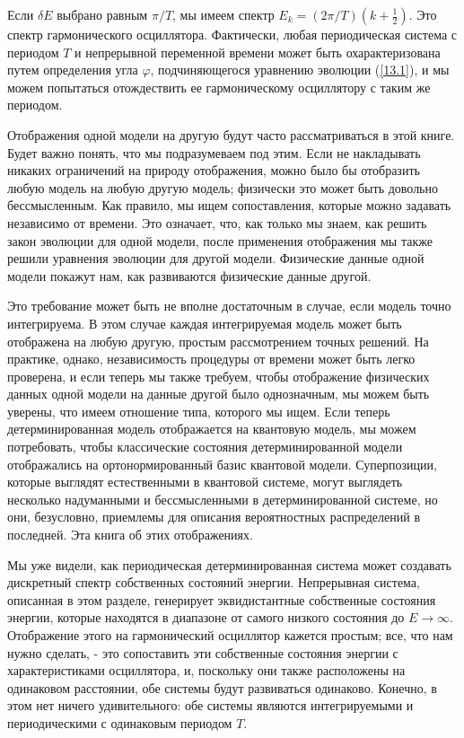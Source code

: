 \documentclass[main.tex]{subfiles}
\begin{document}
Если $\delta E$ выбрано равным $\pi / T$, мы имеем спектр $E_k = (2\pi / T) (k + \frac 1 2)$. Это спектр гармонического осциллятора. Фактически, любая периодическая система с периодом $T$ и непрерывной переменной времени может быть охарактеризована путем определения угла $\varphi$, подчиняющегося уравнению эволюции (\ref{13.1}), и мы можем попытаться отождествить ее гармоническому осциллятору с таким же периодом.

Отображения одной модели на другую будут часто рассматриваться в этой книге. Будет важно понять, что мы подразумеваем под этим. Если не накладывать никаких ограничений на природу отображения, можно было бы отобразить любую модель на любую другую модель; физически это может быть довольно бессмысленным. Как правило, мы ищем сопоставления, которые можно задавать независимо от времени. Это означает, что, как только мы знаем, как решить закон эволюции для одной модели, после применения отображения мы также решили уравнения эволюции для другой модели. Физические данные одной модели покажут нам, как развиваются физические данные другой.

Это требование может быть не вполне достаточным в случае, если модель точно интегрируема. В этом случае каждая интегрируемая модель может быть отображена на любую другую, простым рассмотрением точных решений. На практике, однако, независимость процедуры от времени может быть легко проверена, и если теперь мы также требуем, чтобы отображение физических данных одной модели на данные другой было однозначным, мы можем быть уверены, что имеем отношение типа, которого мы ищем. Если теперь детерминированная модель отображается на квантовую модель, мы можем потребовать, чтобы классические состояния детерминированной модели отображались на ортонормированный базис квантовой модели. Суперпозиции, которые выглядят естественными в квантовой системе, могут выглядеть несколько надуманными и бессмысленными в детерминированной системе, но они, безусловно, приемлемы для описания вероятностных распределений в последней. Эта книга об этих отображениях.

Мы уже видели, как периодическая детерминированная система может создавать дискретный спектр собственных состояний энергии. Непрерывная система, описанная в этом разделе, генерирует эквидистантные собственные состояния энергии, которые находятся в диапазоне от самого низкого состояния до $E \rightarrow \infty$. Отображение этого на гармонический осциллятор кажется простым; все, что нам нужно сделать, - это сопоставить эти собственные состояния энергии с характеристиками осциллятора, и, поскольку они также расположены на одинаковом расстоянии, обе системы будут развиваться одинаково. Конечно, в этом нет ничего удивительного: обе системы являются интегрируемыми и периодическими с одинаковым периодом $T$.
\end{document}
